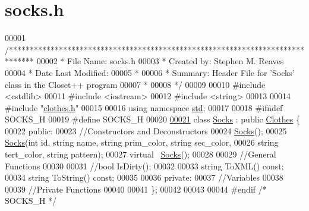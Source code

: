 \hypertarget{socks_8h_source}{}\section{socks.\+h}

\begin{DoxyCode}
00001 \textcolor{comment}{/******************************************************************************}
00002 \textcolor{comment}{ * File Name: socks.h}
00003 \textcolor{comment}{ * Created by: Stephen M. Reaves}
00004 \textcolor{comment}{ * Date Last Modified:}
00005 \textcolor{comment}{ *}
00006 \textcolor{comment}{ * Summary: Header File for 'Socks' class in the Closet++ program}
00007 \textcolor{comment}{ *}
00008 \textcolor{comment}{ */}
00009 
00010 \textcolor{preprocessor}{#include <cstdlib>}
00011 \textcolor{preprocessor}{#include <iostream>}
00012 \textcolor{preprocessor}{#include <string>}
00013 
00014 \textcolor{preprocessor}{#include "\mbox{\hyperlink{clothes_8h}{clothes.h}}"}
00015 
00016 \textcolor{keyword}{using namespace }\mbox{\hyperlink{namespacestd}{std}};
00017 
00018 \textcolor{preprocessor}{#ifndef SOCKS\_H}
00019 \textcolor{preprocessor}{#define SOCKS\_H}
00020 
\mbox{\hyperlink{classSocks}{00021}} \textcolor{keyword}{class }\mbox{\hyperlink{classSocks}{Socks}} : \textcolor{keyword}{public} \mbox{\hyperlink{classClothes}{Clothes}} \{
00022   \textcolor{keyword}{public}:
00023     \textcolor{comment}{//Constructors and Deconstructors}
00024     \mbox{\hyperlink{classSocks}{Socks}}();
00025     \mbox{\hyperlink{classSocks}{Socks}}(\textcolor{keywordtype}{int} \textcolor{keywordtype}{id}, \textcolor{keywordtype}{string} name, \textcolor{keywordtype}{string} prim\_color, \textcolor{keywordtype}{string} sec\_color, 
00026           \textcolor{keywordtype}{string} tert\_color, \textcolor{keywordtype}{string} pattern); 
00027     \textcolor{keyword}{virtual} ~\mbox{\hyperlink{classSocks}{Socks}}();
00028 
00029     \textcolor{comment}{//General Functions}
00030 
00031     \textcolor{comment}{//bool IsDirty();}
00032 
00033     \textcolor{keywordtype}{string} ToXML() \textcolor{keyword}{const};
00034     \textcolor{keywordtype}{string} ToString() \textcolor{keyword}{const};
00035   
00036   \textcolor{keyword}{private}:
00037     \textcolor{comment}{//Variables}
00038 
00039     \textcolor{comment}{//Private Functions}
00040 
00041 \};
00042 
00043 
00044 \textcolor{preprocessor}{#endif }\textcolor{comment}{/* SOCKS\_H */}\textcolor{preprocessor}{ }
\end{DoxyCode}
